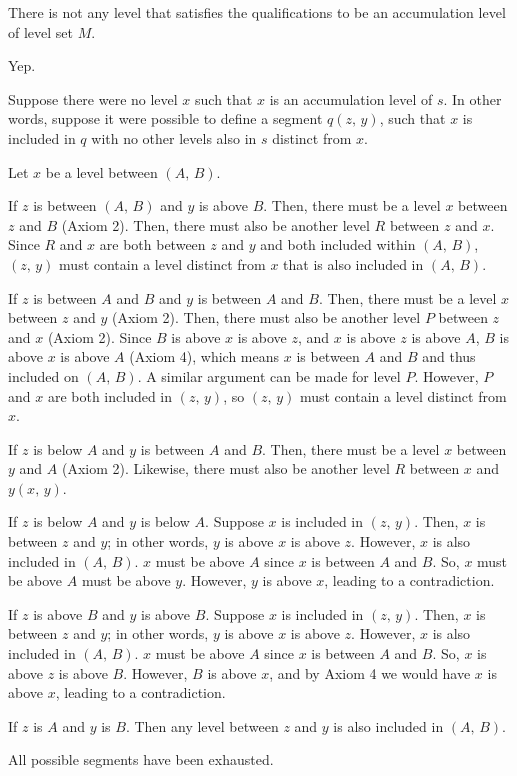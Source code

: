 \documentclass[12pt]{article}
\begin{document}
There is not any level that satisfies the qualifications to be an accumulation level of level set $M$.

\problem
{}
Yep.

Suppose there were no level $x$ such that $x$ is an accumulation level of $s$. In other words, suppose it were possible to define a segment $q(z,\, y)$, such that $x$ is included in $q$ with no other levels also in $s$ distinct from $x$.

Let $x$ be a level between $(A,\, B)$.

If $z$ is between $(A,\, B)$ and $y$ is above $B$. Then, there must be a level $x$ between $z$ and $B$ (Axiom 2). Then, there must also be another level $R$ between $z$ and $x$. Since $R$ and $x$ are both between $z$ and $y$ and both included within $(A,\, B)$, $(z,\, y)$ must contain a level distinct from $x$ that is also included in $(A,\, B)$.

If $z$ is between $A$ and $B$ and $y$ is between $A$ and $B$. Then, there must be a level $x$ between $z$ and $y$ (Axiom 2). Then, there must also be another level $P$ between $z$ and $x$ (Axiom 2). Since $B$ is above $x$ is above $z$, and $x$ is above $z$ is above $A$, $B$ is above $x$ is above $A$ (Axiom 4), which means $x$ is between $A$ and $B$ and thus included on $(A,\, B)$. A similar argument can be made for level $P$. However, $P$ and $x$ are both included in $(z,\, y)$, so $(z,\, y)$ must contain a level distinct from $x$.

If $z$ is below $A$ and $y$ is between $A$ and $B$. Then, there must be a level $x$ between $y$ and $A$ (Axiom 2). Likewise, there must also be another level $R$ between $x$ and $y(x,\, y)$.

If $z$ is below $A$ and $y$ is below $A$. Suppose $x$ is included in $(z,\, y)$. Then, $x$ is between $z$ and $y$; in other words, $y$ is above $x$ is above $z$.  However, $x$ is also included in $(A,\, B)$. $x$ must be above $A$ since $x$ is between $A$ and $B$. So, $x$ must be above $A$ must be above $y$. However, $y$ is above $x$, leading to a contradiction.

If $z$ is above $B$ and $y$ is above $B$. Suppose $x$ is included in $(z,\, y)$. Then, $x$ is between $z$ and $y$; in other words, $y$ is above $x$ is above $z$. However, $x$ is also included in $(A,\, B)$. $x$ must be above $A$ since $x$ is between $A$ and $B$. So, $x$ is above $z$ is above $B$. However, $B$ is above $x$, and by Axiom 4 we would have $x$ is above $x$, leading to a contradiction.

If $z$ is $A$ and $y$ is $B$. Then any level between $z$ and $y$ is also included in $(A,\, B)$.

All possible segments have been exhausted.
\end{document}
